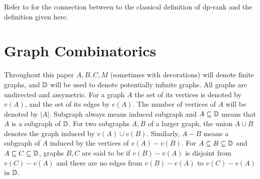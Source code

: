 \documentclass{amsart}
\begin{document}
Refer to \cite{guingona} for the connection between to the classical definition of dp-rank and the definition given here.

\section{Graph Combinatorics}
Throughout this paper $A, B, C, M$ (sometimes with decorations) will denote finite graphs,
and $\mathbb D$ will be used to denote potentially infinite graphs.
All graphs are undirected and assymetric.
For a graph $A$ the set of its vertices is denoted by $v(A)$, and the set of its edges by $e(A)$.
The number of vertices of $A$ will be denoted by $|A|$.
Subgraph always means induced subgraph and $A \subseteq \mathbb D$ means that $A$ is a subgraph of $\mathbb D$.
For two subgraphs $A, B$ of a larger graph, the union $A \cup B$ denotes the graph induced by $v(A) \cup v(B)$.
Similarly, $A - B$ means a subgraph of $A$ induced by the vertices of $v(A) - v(B)$.
For $A \subseteq B \subseteq \mathbb D$ and $A \subseteq C \subseteq \mathbb D$,
graphs $B,C$ are said to be  if $v(B) - v(A)$ is disjoint from $v(C) - v(A)$
and there are no edges from $v(B) - v(A)$ to $v(C) - v(A)$ in $\mathbb D$.
\end{document}
